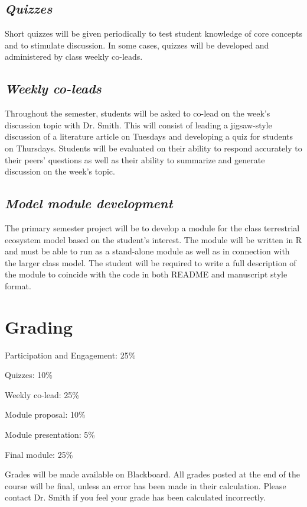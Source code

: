\documentclass[12pt, notitlepage]{article}   	%
\begin{document}
{\subsection{\textit{Quizzes}}
Short quizzes will be given periodically to test student knowledge of core concepts and to
stimulate discussion. In some cases, quizzes will be developed and administered
by class weekly co-leads.

\subsection{\textit{Weekly co-leads}}
Throughout the semester, students will be asked to co-lead on the week's discussion
topic with Dr. Smith. This will consist of leading a jigsaw-style discussion of a literature article on Tuesdays
and developing a quiz for students on Thursdays.
Students will be evaluated on their ability to respond accurately to their peers' questions
as well as their ability to summarize and generate discussion on the week's topic.

\subsection{\textit{Model module development}}
The primary semester project will be to develop a module for the class terrestrial ecosystem
model based on the student's interest. The module will be written in R and must be able to
run as a stand-alone module as well as in connection with the larger class model.
The student will be required to write a full description of the module to coincide with the
code in both README and manuscript style format.

\section{Grading}
Participation and Engagement: 25\% \par
Quizzes: 10\% \par
Weekly co-lead: 25\% \par
Module proposal: 10\% \par
Module presentation: 5\% \par
Final module: 25\% \par

Grades will be made available on Blackboard. 
All grades posted at the end of the course will be final, 
unless an error has been made in their calculation.
Please contact Dr. Smith if you feel your grade has been calculated incorrectly.

}
\end{document}
